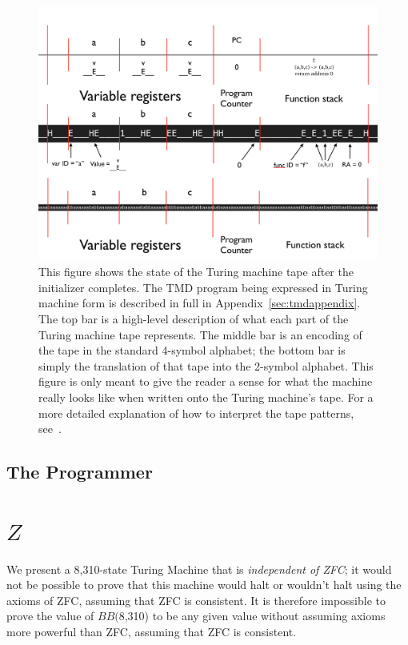 \documentclass[11pt]{article}
\newcommand{\statenumstate}{8,310-state }
\newcommand{\bbstatenum}{$BB($8,310) }
\begin{document}
\begin{figure} 
\begin{center} 
\includegraphics[scale=0.6]{figs/postinit.png}
\caption{This figure shows the state of the Turing machine tape after the initializer completes. The TMD program being expressed in Turing machine form is described in full in Appendix~\ref{sec:tmdappendix}. The top bar is a high-level description of what each part of the Turing machine tape represents. The middle bar is an encoding of the tape in the standard 4-symbol alphabet; the bottom bar is simply the translation of that tape into the 2-symbol alphabet. This figure is only meant to give the reader a sense for what the machine really looks like when written onto the Turing machine's tape. For a more detailed explanation of how to interpret the tape patterns, see~\cite{fig:github}. \label{fig:postinit}} 
\end{center} 
\end{figure}

\subsection{The Programmer}

\section{$Z$}

We present a \statenumstate Turing Machine that is \emph{independent of ZFC}; it would not be possible to prove that this machine would halt or wouldn't halt using the axioms of ZFC, assuming that ZFC is consistent. It is therefore impossible to prove the value of \bbstatenum to be any given value without assuming axioms more powerful than ZFC, assuming that ZFC is consistent. \\
\end{document}
